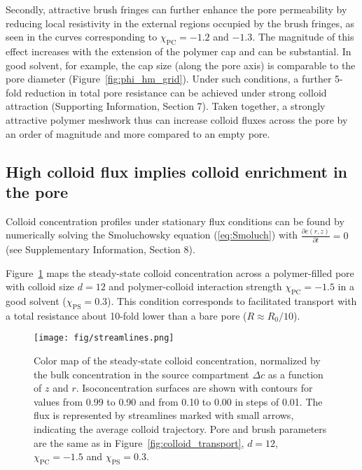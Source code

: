 \documentclass[12pt, a4paper]{article}
\begin{document}
Secondly, attractive brush fringes can further enhance the pore permeability by reducing local resistivity in the external regions occupied by the brush fringes, as seen in the curves corresponding to $\chi_{\text{PC}} = -1.2$ and $-1.3$.
The magnitude of this effect increases with the extension of the polymer cap and can be substantial. In good solvent, for example, the cap size (along the pore axis) is comparable to the pore diameter (Figure~\ref{fig:phi_hm_grid}). Under such conditions, a further 5-fold reduction in total pore resistance can be achieved under strong colloid attraction (Supporting Information, Section 7).
Taken together, a strongly attractive polymer meshwork thus can increase colloid fluxes across the pore by an order of magnitude and more compared to an empty pore.



\subsection{High colloid flux implies colloid enrichment in the pore}

Colloid concentration profiles under stationary flux conditions can be found by numerically solving the Smoluchowsky equation (\ref{eq:Smoluch}) with $\frac{\partial c(r,z)}{\partial t} = 0$  (see Supplementary Information, Section 8). 

Figure~\ref{fig:colloid_concentration} maps the steady-state colloid concentration across a polymer-filled pore with colloid size $d = 12$ and polymer-colloid interaction strength $\chi_{\text{PC}} = -1.5$ in a good solvent ($\chi_{\text{PS}} = 0.3$).
This condition corresponds to facilitated transport with a total resistance about 10-fold lower than a bare pore ($R \approx R_0/10$).

\begin{figure}
    \centering
    \texttt{[image: fig/streamlines.png]}
    \caption{
    Color map of the steady-state colloid concentration, normalized by the bulk concentration in the source compartment $\Delta c$ as a function of $z$ and $r$.
    Isoconcentration surfaces are shown with contours for values from 0.99 to 0.90 and from 0.10 to 0.00 in steps of 0.01.
    The flux is represented by streamlines marked with small arrows, indicating the average colloid trajectory.
    Pore and brush parameters are the same as in Figure~\ref{fig:colloid_transport}, $d = 12$, $\chi_{\text{PC}} = -1.5$ and $\chi_{\text{PS}} = 0.3$.
    }
    \label{fig:colloid_concentration}
\end{figure}
\end{document}
